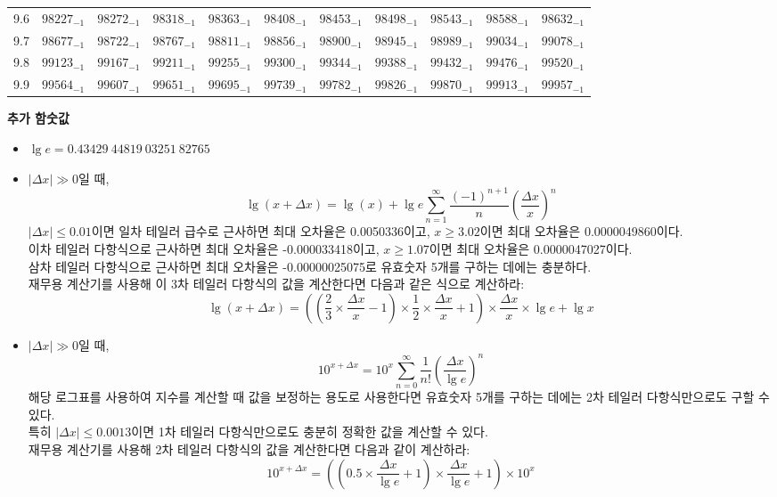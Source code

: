 \documentclass[10pt, a4paper]{article}
\begin{document}
\begin{center}
\begin{longtable}{c || c c c c c | c c c c c}
        9.6 & \({98227}_{-1}\) & \({98272}_{-1}\) & \({98318}_{-1}\) & \({98363}_{-1}\) & \({98408}_{-1}\) & \({98453}_{-1}\) & \({98498}_{-1}\) & \({98543}_{-1}\) & \({98588}_{-1}\) & \({98632}_{-1}\)\\
        9.7 & \({98677}_{-1}\) & \({98722}_{-1}\) & \({98767}_{-1}\) & \({98811}_{-1}\) & \({98856}_{-1}\) & \({98900}_{-1}\) & \({98945}_{-1}\) & \({98989}_{-1}\) & \({99034}_{-1}\) & \({99078}_{-1}\)\\
        9.8 & \({99123}_{-1}\) & \({99167}_{-1}\) & \({99211}_{-1}\) & \({99255}_{-1}\) & \({99300}_{-1}\) & \({99344}_{-1}\) & \({99388}_{-1}\) & \({99432}_{-1}\) & \({99476}_{-1}\) & \({99520}_{-1}\)\\
        9.9 & \({99564}_{-1}\) & \({99607}_{-1}\) & \({99651}_{-1}\) & \({99695}_{-1}\) & \({99739}_{-1}\) & \({99782}_{-1}\) & \({99826}_{-1}\) & \({99870}_{-1}\) & \({99913}_{-1}\) & \({99957}_{-1}\)\\
    \end{longtable}
    \pagebreak
    \textbf{추가 함숫값}
    \begin{itemize}
        \item \(\lg{e}=0.43429\ 44819\ 03251\ 82765\)
        \item 
        \(\left\lvert\Delta x\right\rvert \gg 0\)일 때, 
        \[\lg\left(x+\Delta x\right) = \lg\left(x\right) + \lg{e}\sum_{n=1}^{\infty}{\frac{\left(-1\right)^{n+1}}{n}\left(\frac{\Delta x}{x}\right)^{n}}\]
        \(\left\lvert\Delta x\right\rvert \leq 0.01\)이면 일차 테일러 급수로 근사하면 최대 오차율은 0.0050336이고, \(x \geq 3.02\)이면 최대 오차율은 0.0000049860이다. \\
        이차 테일러 다항식으로 근사하면 최대 오차율은 -0.000033418이고, \(x \geq 1.07\)이면 최대 오차율은 0.0000047027이다. \\
        삼차 테일러 다항식으로 근사하면 최대 오차율은 -0.00000025075로 유효숫자 5개를 구하는 데에는 충분하다. \\
        재무용 계산기를 사용해 이 3차 테일러 다항식의 값을 계산한다면 다음과 같은 식으로 계산하라:
        \[\lg\left(x+\Delta x\right)=\left(\left(\frac{2}{3}\times\frac{\Delta x}{x} - 1\right)\times\frac{1}{2}\times\frac{\Delta x}{x} + 1\right) \times \frac{\Delta x}{x}\times\lg{e} + \lg{x}\]
        \item 
        \(\left\lvert\Delta x\right\rvert \gg 0\)일 때, 
        \[{10}^{x+\Delta x} = {10}^{x}\sum_{n=0}^{\infty}{\frac{1}{n!}\left(\frac{\Delta x}{\lg{e}}\right)^{n}}\]
        해당 로그표를 사용하여 지수를 계산할 때 값을 보정하는 용도로 사용한다면 유효숫자 5개를 구하는 데에는 2차 테일러 다항식만으로도 구할 수 있다. \\
        특히 \(\left\lvert\Delta{x}\right\rvert \leq 0.0013\)이면 1차 테일러 다항식만으로도 충분히 정확한 값을 계산할 수 있다. \\
        재무용 계산기를 사용해 2차 테일러 다항식의 값을 계산한다면 다음과 같이 계산하라: 
        \[{10}^{x+\Delta x}= \left(\left(0.5 \times \frac{\Delta{x}}{\lg{e}} + 1\right) \times \frac{\Delta x}{\lg{e}} + 1\right) \times {10}^{x}\]
    \end{itemize}
\end{center}
\end{document}
